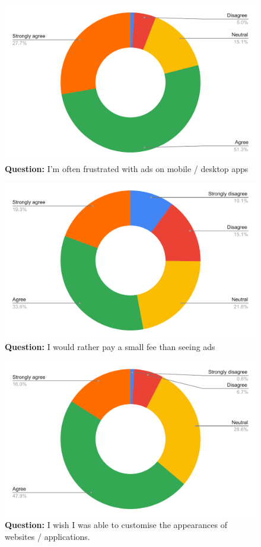 \begin{figure}[H]
  \centering
  \includegraphics[width=13cm]{thesis/paper/images/p1_q6.pdf}
  \textbf{Question:} I'm often frustrated with ads on mobile / desktop apps
\end{figure}

\begin{figure}[H]
  \centering
  \includegraphics[width=13cm]{thesis/paper/images/p1_q7.pdf}
  \textbf{Question:} I would rather pay a small fee than seeing ads
\end{figure}

\begin{figure}[H]
  \centering
  \includegraphics[width=13cm]{thesis/paper/images/p1_q8.pdf}
  \textbf{Question:} I wish I was able to customise the appearances of websites / applications.
\end{figure}


